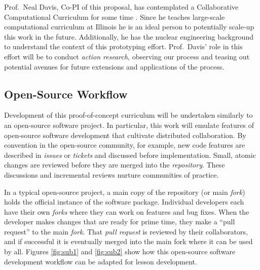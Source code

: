 \documentclass[11pt]{article}
\begin{document}
          Prof.~Neal Davis, Co-PI of this proposal, has contemplated a 
          Collaborative Computational Curriculum for some time 
          \cite{davis_university_2016}. Since he 
          teaches large-scale computational curriculum at Illinois 
          he is an ideal person to potentially scale-up this work in the 
          future. Additionally, he has the nuclear engineering background to 
          understand the context of this prototyping effort. Prof.~Davis' role 
          in this effort will be to conduct \emph{action research}, observing 
          our process and teasing out potential avenues for future 
          extensions and applications of the process. 

          \subsection{Open-Source Workflow}
          Development of this proof-of-concept curriculum will be undertaken 
          similarly to an open-source software project. 
          In particular, this work will emulate features of open-source software development 
          that cultivate distributed collaboration. By convention in the open-source community, for 
          example, new code features are described in \emph{issues} or 
          \emph{tickets} and discussed before implementation. Small, atomic 
          changes are reviewed before they are merged into the 
          \emph{repository}. These discussions and incremental reviews nurture 
          communities of practice.

          In a typical open-source project, a main copy of the 
          repository (or main \emph{fork}) holds the 
          official instance of the software package. Individual developers each have their own 
          \emph{forks} where they can work on features and 
          bug fixes. When the developer makes changes that are ready for prime 
          time, they make a ``pull request'' to the main \emph{fork}. That 
          \emph{pull request} is 
          reviewed by their collaborators, and if successful it is eventually merged into the 
          main fork where it can be used by all. Figures 
          \ref{fig:sub1} and \ref{fig:sub2} show how this open-source software 
          development workflow can be adapted for lesson development.
\end{document}
